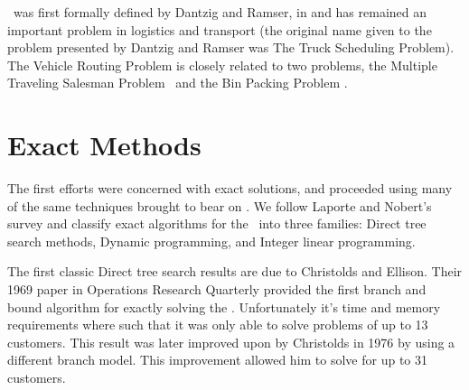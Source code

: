 

% 

\VRP\ was first formally defined by Dantzig and Ramser, in \cite{Dantzig:1959} and has remained an important problem in logistics and transport (the original name given to the problem presented by Dantzig and Ramser was The Truck Scheduling Problem). The Vehicle Routing Problem is closely related to two problems, the Multiple Traveling Salesman Problem \MTSP\ and the Bin Packing Problem \BPP.

\section{Exact Methods}

The first efforts were concerned with exact solutions, and proceeded using many of the same techniques brought to bear on \TSP. 
We follow Laporte and Nobert's survey \cite{LANO:87} and classify exact algorithms for the \VRP\ into three families: Direct tree search methods, Dynamic programming, and Integer linear programming.

The first classic Direct tree search results are due to Christolds and Ellison. Their 1969 paper in Operations Research Quarterly provided the first branch and bound algorithm for exactly solving the \VRP \cite{CE:1969}. Unfortunately it's time and memory requirements where such that it was only able to solve problems of up to 13 customers. This result was later improved upon by Christolds in 1976 by using a different branch model. This improvement allowed him to solve for up to 31 customers. 

